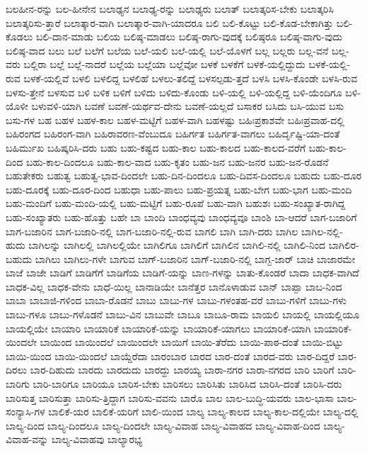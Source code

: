 {ಬಲಹೀನ-ರನ್ನು
ಬಲ-ಹೀನೇನ
ಬಲಾಢ್ಯನ
ಬಲಾಢ್ಯ-ರನ್ನು
ಬಲಾಢ್ಯರು
ಬಲಾತ್
ಬಲಾತ್ಕರಿಸ-ಬೇಕು
ಬಲಾತ್ಕರಿಸಿ
ಬಲಾತ್ಕರಿಸು-ತ್ತಾರೆ
ಬಲಾತ್ಕಾರ-ವಾಗಿ
ಬಲಾತ್ಕಾರ-ವಾಗಿ-ಯಾದರೂ
ಬಲಿ
ಬಲಿ-ಕೊಟ್ಟು
ಬಲಿ-ಕೊಡ-ಬೇಕಾಗಿತ್ತು
ಬಲಿ-ಕೊಡಲು
ಬಲಿ-ದಾನ-ಮಾಡು
ಬಲಿಯ
ಬಲಿಷ್ಠ-ಮಾಡಲು
ಬಲಿಷ್ಠ-ರಾಗು-ವುದಕ್ಕೆ
ಬಲಿಷ್ಠರೂ
ಬಲಿಷ್ಠ-ವಾಗು-ವುದು
ಬಲಿಷ್ಠ-ವಾದ
ಬಲು
ಬಲೆ
ಬಲೆಗೆ
ಬಲೆಯ
ಬಲೆ-ಯಲಿ
ಬಲೆ-ಯಲ್ಲಿ
ಬಲೆ-ಯೊಳಗೆ
ಬಲ್ಲ
ಬಲ್ಲರು
ಬಲ್ಲ-ವನೆ
ಬಲ್ಲ-ವರು
ಬಲ್ಲಿರಾ
ಬಲ್ಲೆ
ಬಲ್ಲೆ-ನಾದರೆ
ಬಲ್ಲೆಯ
ಬಲ್ಲೆಯಾ
ಬಲ್ಲೆವೋ
ಬಳಕೆ
ಬಳಕೆಗೆ
ಬಳಕೆ-ಯಲ್ಲಿದ್ದುದು
ಬಳಕೆ-ಯಲ್ಲಿ-ರುವ
ಬಳಕೆ-ಯಲ್ಲಿವೆ
ಬಳಲಿ
ಬಳಲಿದ್ದ
ಬಳಲಿಹೆ
ಬಳಲು-ತಲಿದ್ದೆ
ಬಳಸಲ್ಪಡು-ತ್ತದೆ
ಬಳಸಿ
ಬಳಸಿ-ಕೊಂಡೇ
ಬಳಸಿ-ರುವ
ಬಳಸು-ತ್ತೇನೆ
ಬಳಸುವ
ಬಳಿ
ಬಳಿಕ
ಬಳಿಗೆ
ಬಳಿದು
ಬಳಿದು-ಕೊಂಡು
ಬಳಿ-ಯಲ್ಲಿ
ಬಳಿ-ಯಲ್ಲಿದ್ದ
ಬಳಿ-ಯೆಂದಿಗೂ
ಬಳಿ-ಯೊಳೀ
ಬಳುವಳಿ-ಯಾಗಿ
ಬವಣೆ
ಬವಣೆ-ಯರ್ಥವ-ದೇನು
ಬವಣೆ-ಯಲ್ಲದೆ
ಬಸಾಕರ
ಬಸಿದು
ಬಸಿ-ಯುವ
ಬಸು
ಬಸು-ಗಳ
ಬಹ
ಬಹಳ
ಬಹಳ-ಕಾಲ
ಬಹಳ-ಮಟ್ಟಿಗೆ
ಬಹಳ-ವಾಗಿ
ಬಹಳಷ್ಟು
ಬಹಿಃಪ್ರಕಾಶವೇ
ಬಹಿಃಪ್ರವಾಹ-ದಲ್ಲಿ
ಬಹಿರಂಗದ
ಬಹಿರಂಗ-ವಾಗಿ
ಬಹಿರಾವರಣ-ವೆಂಬುದೂ
ಬಹಿರ್ಗತ
ಬಹಿರ್ಗತ-ವಾಗಲು
ಬಹಿರ್ದೃಷ್ಟಿ-ಯಾ-ದಂತೆ
ಬಹಿರ್ಮುಖ
ಬಹಿಷ್ಕರಿಸಿ-ದರು
ಬಹು
ಬಹು-ಕಷ್ಟದ
ಬಹು-ಕಾಲ
ಬಹು-ಕಾಲದ
ಬಹು-ಕಾಲದ-ವರೆಗೆ
ಬಹು-ಕಾಲ-ದಿಂದ
ಬಹು-ಕಾಲ-ದಿಂದಲೂ
ಬಹು-ಕಾಲ-ವಾದ
ಬಹು-ಕೃತಂ
ಬಹು-ಜನ
ಬಹು-ಜನರ
ಬಹು-ಜನ-ರೊಡನೆ
ಬಹುತೇಕರು
ಬಹುತ್ವ
ಬಹುತ್ವ-ಭಾವ-ದಿಂದಲೇ
ಬಹು-ದಿನ-ದಿಂದಲೂ
ಬಹು-ದಿವಸ-ದಿಂದಲೂ
ಬಹುದು
ಬಹು-ದೂರ
ಬಹು-ದೂರಕ್ಕೆ
ಬಹು-ದೂರ-ದಿಂದ
ಬಹುಧಾ
ಬಹು-ಪಾಲು
ಬಹು-ಪ್ರಯತ್ನ
ಬಹು-ಬೇಗ
ಬಹು-ಭಾಗ
ಬಹು-ಮಂದಿ
ಬಹು-ಮಂದಿಗೆ
ಬಹು-ಮಂದಿ-ಯಲ್ಲಿ
ಬಹು-ಮಟ್ಟಿಗೆ
ಬಹು-ರೂಪೆ
ಬಹು-ವಾಗಿ
ಬಹುಶಃ
ಬಹು-ಸಂಖ್ಯಾತ-ರಾಗಿದ್ದ
ಬಹು-ಸಂಖ್ಯಾತರು
ಬಹು-ಹೊತ್ತು
ಬಹೇ
ಬಾ
ಬಾಂದಿ
ಬಾಂಧವ್ಯವು
ಬಾಂಧವ್ಯವೂ
ಬಾಂಶಿ
ಬಾ-ಆದರೆ
ಬಾಗ-ಬಜಾರಿಗೆ
ಬಾಗ-ಬಜಾರಿನ
ಬಾಗ-ಬಜಾರಿ-ನಲ್ಲಿ
ಬಾಗ-ಬಜಾರಿ-ನಲ್ಲಿ-ರುವ
ಬಾಗಲಿ
ಬಾಗಿ
ಬಾಗಿ-ದರು
ಬಾಗಿಲ
ಬಾಗಿಲ-ನಲ್ಲಿ-ಹುದು
ಬಾಗಿಲನ್ನು
ಬಾಗಿಲಲ್ಲಿ
ಬಾಗಿಲಲ್ಲಿಯೇ
ಬಾಗಿಲಿಗೂ
ಬಾಗಿಲಿಗೆ
ಬಾಗಿಲಿನ
ಬಾಗಿಲಿ-ನಲ್ಲಿ
ಬಾಗಿಲಿ-ನಿಂದ
ಬಾಗಿಲಿರ-ಬಹುದು
ಬಾಗಿಲು
ಬಾಗಿಲು-ಗಳೇ
ಬಾಗುವ
ಬಾಗ್-ಬಜಾರಿನ
ಬಾಗ್-ಬಜಾರಿ-ನಲ್ಲಿ
ಬಾಗ್ಬ-ಜಾರ್
ಬಾಚಿ
ಬಾಜಾರಮೇ
ಬಾಜೆ
ಬಾಜೇ
ಬಾಡಿಗೆ
ಬಾಡಿಗೆಗೆ
ಬಾಡಿಗೆಯ
ಬಾಡಿಗೆ-ಯನ್ನು
ಬಾಣ-ಗಳನ್ನು
ಬಾತು-ಕೊಂಡರೆ
ಬಾದಾ
ಬಾಧಕ-ವಾಗಿದೆ
ಬಾಧಕ-ವಿಲ್ಲ
ಬಾಧಕ-ವೇನು
ಬಾಧೆ-ಯಿಲ್ಲ
ಬಾನಾಡಿಯೇ
ಬಾನೆತ್ತರ
ಬಾನೊಳಾಡುವ
ಬಾನ್
ಬಾಪ್ಪಾ
ಬಾಬ-ನಿಂದ
ಬಾಬಾ
ಬಾಬಾಜಿ-ಗಳಿಂದ
ಬಾಬಾ-ರೊಡನೆ
ಬಾಬು
ಬಾಬು-ಗಳ
ಬಾಬು-ಗಳಂತಹ-ವರೆ
ಬಾಬು-ಗಳಿಗೆ
ಬಾಬು-ಗಳು
ಬಾಬು-ಗಳೂ
ಬಾಬು-ಗಳೊಡನೆ
ಬಾಬು-ವಿನ
ಬಾಬುವೇ
ಬಾಬೂ
ಬಾಬೂ-ರಾಮ
ಬಾಯಲಿ
ಬಾಯಲ್ಲಿ
ಬಾಯಲ್ಲಿಯೂ
ಬಾಯಲ್ಲಿಯೇ
ಬಾಯಾರಿ
ಬಾಯಾರಿಕೆ
ಬಾಯಾರಿಕೆ-ಯನ್ನು
ಬಾಯಾರಿಕೆ-ಯಾಗಲು
ಬಾಯಾರಿಕೆ-ಯಾಗಿ
ಬಾಯಾರಿಕೆ-ಯಿಂದಲೇ
ಬಾಯಿಂದ
ಬಾಯಿಂದಲೆ
ಬಾಯಿಂದಲೇ
ಬಾಯಿಗೆ
ಬಾಯಿ-ತೆರೆದು
ಬಾಯಿ-ಪಾಠ-ದಂತೆ
ಬಾಯಿ-ಬಿಟ್ಟು
ಬಾಯಿ-ಯಿಂದ
ಬಾಯಿ-ಯಿಂದಲೆ
ಬಾಯ್ದೆರೆದಾ
ಬಾರಂಬಾರ
ಬಾರದ
ಬಾರ-ದಂತೆ
ಬಾರದ-ವರು
ಬಾರ-ದಿದ್ದರೆ
ಬಾರ-ದಿರಲು
ಬಾರ-ದಿಹುದು
ಬಾರದು
ಬಾರದುದು
ಬಾರದ್ದು
ಬಾರಯ್ಯ
ಬಾರಾ-ನಗರ
ಬಾರಾ-ನಗರದ
ಬಾರಿ
ಬಾರಿಗೆ
ಬಾರಿ-ಬಾರಿಗು
ಬಾರಿ-ಬಾರಿಗೂ
ಬಾರಿಯೂ
ಬಾರಿಸ-ಬೇಕು
ಬಾರಿಸಲು
ಬಾರಿಸಿತು
ಬಾರಿಸಿದ
ಬಾರಿಸಿ-ದಂತೆ
ಬಾರಿಸಿ-ದರು
ಬಾರಿಸುತ್ತ
ಬಾರಿಸುತ್ತಾ
ಬಾರಿಸು-ತ್ತಿದ್ದಾಗ
ಬಾರಿಸು-ವವನು
ಬಾರೊ
ಬಾಲ
ಬಾಲ-ಬುದ್ಧಿ-ಯವರು
ಬಾಲ-ಭಾಸಾ
ಬಾಲ-ಸಂನ್ಯಾಸಿ-ಗಳ
ಬಾಲಿಕೆ-ಯರ
ಬಾಲಿಕೆ-ಯರಿಗೆ
ಬಾಲಿ-ಯಿಂದ
ಬಾಲ್ಯ
ಬಾಲ್ಯ-ಕಾಲದ
ಬಾಲ್ಯ-ಕಾಲ-ದಲ್ಲಿಯೇ
ಬಾಲ್ಯ-ದಲ್ಲಿ
ಬಾಲ್ಯ-ದಿಂದ
ಬಾಲ್ಯ-ದಿಂದಲೂ
ಬಾಲ್ಯ-ದಿಂದಲೇ
ಬಾಲ್ಯ-ವಿವಾಹ
ಬಾಲ್ಯ-ವಿವಾಹದ
ಬಾಲ್ಯ-ವಿವಾಹ-ದಿಂದ
ಬಾಲ್ಯ-ವಿವಾಹ-ವನ್ನು
ಬಾಲ್ಯ-ವಿವಾಹವು
ಬಾಲ್ಯಾರಭ್ಯ
}
